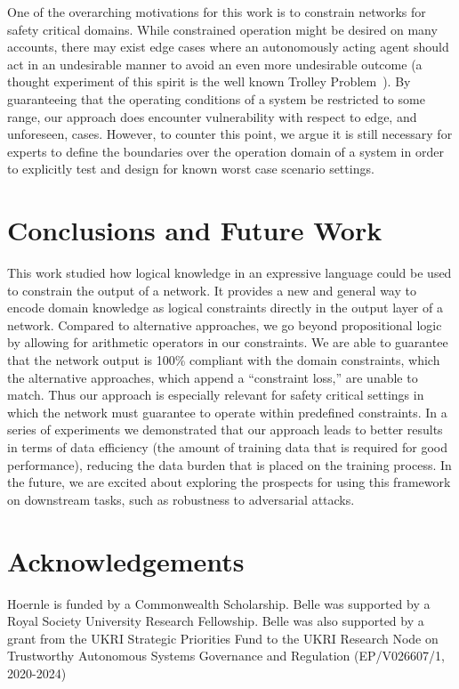 \documentclass[letterpaper]{article} %
\begin{document}
One of the overarching motivations for this work is to constrain networks for safety critical domains.
While constrained operation might be desired on many accounts, there may exist edge cases where an autonomously acting agent should act in an undesirable manner to avoid an even more undesirable outcome (a thought experiment of this spirit is the well known Trolley Problem~\citep{hammond2021learning}).
By guaranteeing that the operating conditions of a system be restricted to some range, our approach does encounter vulnerability with respect to  edge, and unforeseen, cases.
However, to counter this point,  we argue it is still necessary for experts to define the boundaries over the operation domain of a system in order to explicitly test and design for known worst case scenario settings.


\section{Conclusions and Future Work}

This work studied  how logical knowledge in an expressive language could be used to constrain the output of a network.
It provides a new and general way to encode domain knowledge as logical constraints directly in the output layer of a network.
Compared to  alternative approaches, we go beyond propositional logic by allowing for arithmetic operators in our constraints.
We are able to guarantee that the network output is 100\% compliant with the  domain constraints, which the alternative approaches, which append a ``constraint loss,'' are unable to match. Thus our approach is especially relevant for safety critical settings in which the network  must guarantee to operate within predefined constraints.
In a series of experiments we demonstrated that our approach leads to better results in terms of data efficiency (the amount of training data that is required for good performance), reducing the data burden that is placed on the training process.
In the future, we are excited about exploring the prospects for using this framework on downstream tasks, such as robustness to adversarial attacks.

% 
\section*{Acknowledgements}
Hoernle is funded by a Commonwealth Scholarship. Belle was supported by a Royal Society University Research Fellowship. Belle was also supported by a grant from the UKRI Strategic Priorities Fund to the UKRI Research Node on Trustworthy Autonomous Systems Governance and Regulation (EP/V026607/1, 2020-2024)
\end{document}
